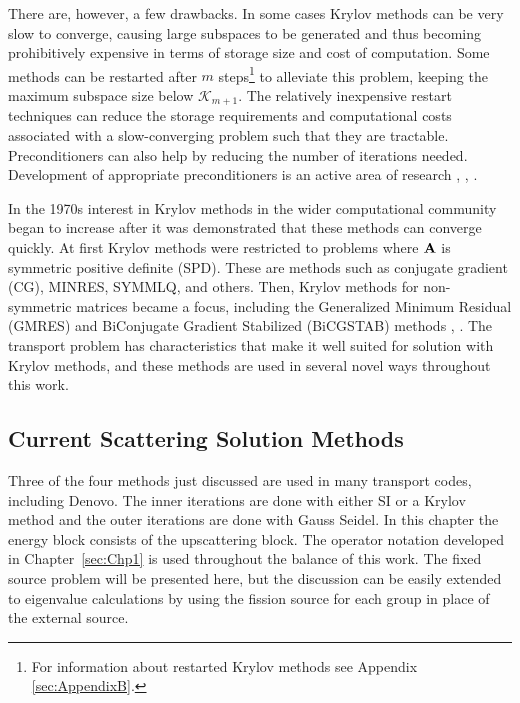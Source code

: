 There are, however, a few drawbacks. In some cases Krylov methods can be very slow to converge, causing large subspaces to be generated and thus becoming prohibitively expensive in terms of storage size and cost of computation. Some methods can be restarted after $m$ steps\footnote{For information about restarted Krylov methods see Appendix \ref{sec:AppendixB}.} to alleviate this problem, keeping the maximum subspace size below $\mathcal{K}_{m+1}$.  The relatively inexpensive restart techniques can reduce the storage requirements and computational costs associated with a slow-converging problem such that they are tractable. Preconditioners can also help by reducing the number of iterations needed. Development of appropriate preconditioners is an active area of research \cite{Warsa2004a}, \cite{Ipsen1998}, \cite{Knoll2004}. 

In the 1970s interest in Krylov methods in the wider computational community began to increase after it was demonstrated that these methods can converge quickly. At first Krylov methods were restricted to problems where $\mathbf{A}$ is symmetric positive definite (SPD). These are methods such as conjugate gradient (CG), MINRES, SYMMLQ, and others. Then, Krylov methods for non-symmetric matrices became a focus, including the Generalized Minimum Residual (GMRES) and BiConjugate Gradient Stabilized (BiCGSTAB) methods \cite{Barrett1994}, \cite{Benzi2002}. The transport problem has characteristics that make it well suited for solution with Krylov methods, and these methods are used in several novel ways throughout this work.

\subsection{Current Scattering Solution Methods}
Three of the four methods just discussed are used in many transport codes, including Denovo. The inner iterations are done with either SI or a Krylov method and the outer iterations are done with Gauss Seidel. In this chapter the energy block consists of the upscattering block. The operator notation developed in Chapter~\ref{sec:Chp1} is used throughout the balance of this work. The fixed source problem will be presented here, but the discussion can be easily extended to eigenvalue calculations by using the fission source for each group in place of the external source. 

